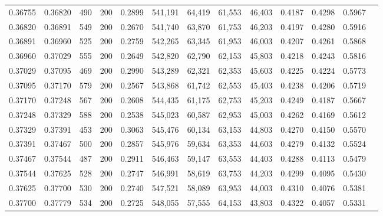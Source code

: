 \begin{tabular}{rrrrrrrrrrrrr}
0.36755 & 0.36820 &    490 & 200 &                                     0.2899 & 541,191 &  64,419 &  61,553 &  46,403 & 0.4187 & 0.4298 & 0.5967 \\
0.36820 & 0.36891 &    549 & 200 &                                     0.2670 & 541,740 &  63,870 &  61,753 &  46,203 & 0.4197 & 0.4280 & 0.5916 \\
0.36891 & 0.36960 &    525 & 200 &                                     0.2759 & 542,265 &  63,345 &  61,953 &  46,003 & 0.4207 & 0.4261 & 0.5868 \\
0.36960 & 0.37029 &    555 & 200 &                                     0.2649 & 542,820 &  62,790 &  62,153 &  45,803 & 0.4218 & 0.4243 & 0.5816 \\
0.37029 & 0.37095 &    469 & 200 &                                     0.2990 & 543,289 &  62,321 &  62,353 &  45,603 & 0.4225 & 0.4224 & 0.5773 \\
0.37095 & 0.37170 &    579 & 200 &                                     0.2567 & 543,868 &  61,742 &  62,553 &  45,403 & 0.4238 & 0.4206 & 0.5719 \\
0.37170 & 0.37248 &    567 & 200 &                                     0.2608 & 544,435 &  61,175 &  62,753 &  45,203 & 0.4249 & 0.4187 & 0.5667 \\
0.37248 & 0.37329 &    588 & 200 &                                     0.2538 & 545,023 &  60,587 &  62,953 &  45,003 & 0.4262 & 0.4169 & 0.5612 \\
0.37329 & 0.37391 &    453 & 200 &                                     0.3063 & 545,476 &  60,134 &  63,153 &  44,803 & 0.4270 & 0.4150 & 0.5570 \\
0.37391 & 0.37467 &    500 & 200 &                                     0.2857 & 545,976 &  59,634 &  63,353 &  44,603 & 0.4279 & 0.4132 & 0.5524 \\
0.37467 & 0.37544 &    487 & 200 &                                     0.2911 & 546,463 &  59,147 &  63,553 &  44,403 & 0.4288 & 0.4113 & 0.5479 \\
0.37544 & 0.37625 &    528 & 200 &                                     0.2747 & 546,991 &  58,619 &  63,753 &  44,203 & 0.4299 & 0.4095 & 0.5430 \\
0.37625 & 0.37700 &    530 & 200 &                                     0.2740 & 547,521 &  58,089 &  63,953 &  44,003 & 0.4310 & 0.4076 & 0.5381 \\
0.37700 & 0.37779 &    534 & 200 &                                     0.2725 & 548,055 &  57,555 &  64,153 &  43,803 & 0.4322 & 0.4057 & 0.5331 \\

\end{tabular}
